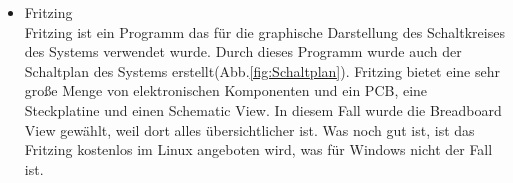 \begin{itemize}
		\item Fritzing \\
		Fritzing ist ein Programm das für die graphische Darstellung des Schaltkreises des Systems verwendet wurde. Durch dieses Programm wurde auch der Schaltplan des Systems erstellt(Abb.\ref{fig:Schaltplan}). Fritzing bietet eine sehr große Menge von elektronischen Komponenten und ein PCB, eine Steckplatine und einen Schematic View. In diesem Fall wurde die Breadboard View gewählt, weil dort alles übersichtlicher ist. Was noch gut ist, ist das Fritzing kostenlos im Linux angeboten wird, was für Windows nicht der Fall ist.\cite{Fritzing}
\end{itemize}	
	
